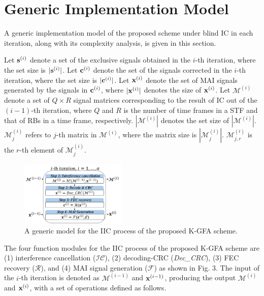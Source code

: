 \documentclass[a4paper]{IEEEtran}
\begin{document}
\section{Generic Implementation Model}

A generic implementation model of the proposed scheme under blind IC in each iteration, along with its complexity analysis, is given in this section.

Let $\bold{s}^{(i)}$ denote a set of the exclusive signals obtained in the $i$-th iteration, where the set size is $|\bold{s}^{(i)}|$. 
Let $\bold{c}^{(i)}$ denote the set of the signals corrected in the $i$-th iteration, where the set size is $|\bold{c}^{(i)}|$. 
Let $\bold{x}^{(i)}$ denote the set of MAI signals generated by the signals in $\bold{c}^{(i)}$, where $|\bold{x}^{(i)}|$ denotes the size of $\bold{x}^{(i)}$.
Let $\mathcal{M}^{(i)}$ denote a set of $Q \times R$ signal matrices corresponding to the result of IC out of the $(i-1)$-th iteration, where $Q$ and $R$ is the number of time frames in a STF and that of RBs in a time frame, respectively. $|\mathcal{M}^{(i)}|$ denotes the set size of $|\mathcal{M}^{(i)}|$. $\mathcal{M}^{(i)}_{j}$ refers to $j$-th matrix in $\mathcal{M}^{(i)}$, where the matrix size is $|\mathcal{M}^{(i)}_j|$.
$\mathcal{M}^{(i)}_{j, r}$ is the $r$-th element of $\mathcal{M}^{(i)}_{j}$.

\begin{figure}[ht!]
    \centering
     \centering
     \includegraphics[width=0.45\textwidth]{Figs/G-modelV2.png}         
    \caption{A generic model for the IIC process of the proposed K-GFA scheme.}
    \label{fig2}
\end{figure}

 The four function modules for the IIC process of the proposed K-GFA scheme are (1) interference cancellation ($\mathcal{IC}$), (2) decoding-CRC (\emph{Dec\_CRC}), (3) FEC recovery ($\mathcal{R}$), and (4) MAI signal generation ($\mathcal{F}$) as shown in Fig. 3. The input of the $i$-th iteration is denoted as $\mathcal{M}^{(i-1)}$ and $\bold{x}^{(i-1)}$, producing the output $\mathcal{M}^{(i)}$ and $\bold{x}^{(i)}$, with a set of operations defined as follows.
\end{document}
